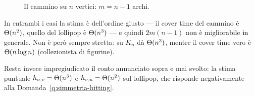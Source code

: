 \begin{figure}[H]
  \centering
  
  \caption{Il cammino su $n$ vertici: $m = n-1$ archi.}
  \label{fig:cammino}
\end{figure}

\begin{osservazione}
  In entrambi i casi la stima è dell'ordine giusto --- il cover time del cammino è
  $\Theta(n^2)$, quello del lollipop è $\Theta(n^3)$ --- e quindi $2m(n-1)$ non è migliorabile in
  generale. Non è però sempre stretta: su $K_n$ dà $\Theta(n^3)$, mentre il cover time vero è
  $\Theta(n \log n)$ (collezionista di figurine).

  Resta invece impregiudicato il conto annunciato sopra e mai svolto: la stima puntuale
  $h_{u,v} = \Theta(n^3)$ e $h_{v,u} = \Theta(n^2)$ sul lollipop, che risponde negativamente alla
  Domanda~\ref{q:simmetria-hitting}.
\end{osservazione}

